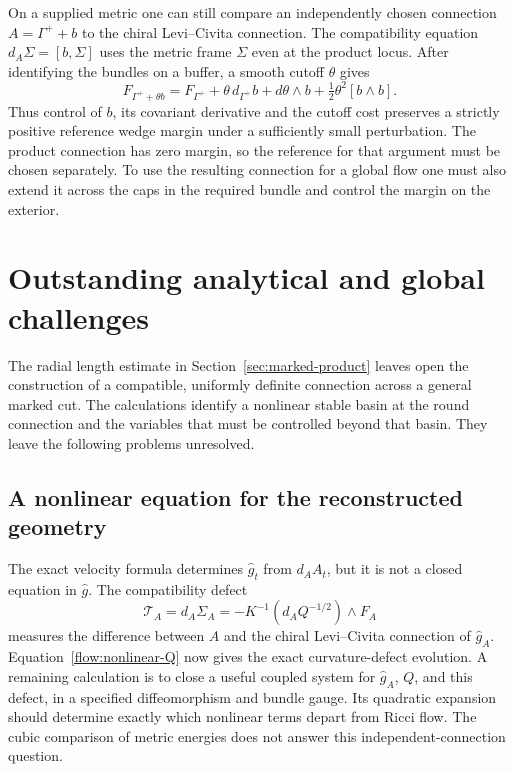 \documentclass[11pt]{article}
\numberwithin{equation}{section}
\theoremstyle{definition}
\theoremstyle{remark}
\begin{document}
On a supplied metric one can still compare an independently chosen
connection \(A=\Gamma^++b\) to the chiral Levi--Civita connection.
The compatibility equation \(d_A\Sigma=[b,\Sigma]\) uses the metric
frame \(\Sigma\) even at the product locus. After identifying the
bundles on a buffer, a smooth cutoff \(\theta\) gives
\[
 F_{\Gamma^++\theta b}=F_{\Gamma^+}+\theta\,d_{\Gamma^+}b+
 d\theta\wedge b+\tfrac12\theta^2[b\wedge b].
\]
Thus control of \(b\), its covariant derivative and the cutoff cost
preserves a strictly positive reference wedge margin under a sufficiently
small perturbation. The product connection has zero margin, so the reference
for that argument must be chosen separately. To use the resulting connection for a global flow
one must also extend it across the caps in the required bundle and
control the margin on the exterior.

\section{Outstanding analytical and global challenges}\label{sec:challenges}

The radial length estimate in Section~\ref{sec:marked-product} leaves open the construction of a compatible, uniformly definite connection across a general marked cut. The calculations identify a nonlinear stable basin at the round connection and the variables that must be controlled beyond that basin. They leave the following problems unresolved.

\subsection{A nonlinear equation for the reconstructed geometry}
The exact velocity formula determines \(\widehat g_t\) from \(d_AA_t\), but it is not a closed equation in \(\widehat g\). The compatibility defect
\[
\mathcal T_A=d_A\Sigma_A
=-K^{-1}(d_AQ^{-1/2})\wedge F_A
\]
measures the difference between \(A\) and the chiral Levi--Civita connection of \(\widehat g_A\). Equation~\eqref{flow:nonlinear-Q} now gives the exact curvature-defect evolution. A remaining calculation is to close a useful coupled system for \(\widehat g_A\), \(Q\), and this defect, in a specified diffeomorphism and bundle gauge. Its quadratic expansion should determine exactly which nonlinear terms depart from Ricci flow. The cubic comparison of metric energies does not answer this independent-connection question.
\end{document}

